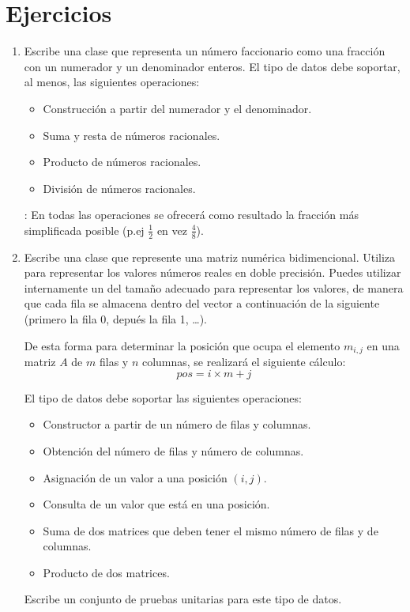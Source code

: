 \section{Ejercicios}

\begin{enumerate}

\item Escribe una clase  que representa un número faccionario como
      una fracción con un numerador y un denominador enteros. El tipo de datos
      debe soportar, al menos, las siguientes operaciones:

\begin{itemize}

  \item Construcción a partir del numerador y el denominador.
  \item Suma y resta de números racionales.
  \item Producto de números racionales.
  \item División de números racionales.

\end{itemize}

: En todas las operaciones se ofrecerá como resultado la fracción
                 más simplificada posible (p.ej $\frac{1}{2}$ en vez $\frac{4}{8}$).

\item Escribe una clase  que represente una matriz numérica bidimencional.
      Utiliza para representar los valores números reales en doble precisión.
      Puedes utilizar internamente un  del tamaño adecuado
      para representar los valores, de manera que cada fila se almacena dentro
      del vector a continuación de la siguiente (primero la fila 0, depués
      la fila 1, \ldots).

      De esta forma para determinar la posición que ocupa el elemento $m_{i,j}$
      en una matriz $A$ de $m$ filas y $n$ columnas, se realizará el siguiente
      cálculo:
\[
pos = i \times m + j
\]


      El tipo de datos debe soportar las siguientes operaciones:

\begin{itemize}
  \item Constructor a partir de un número de filas y columnas.
  \item Obtención del número de filas y número de columnas.
  \item Asignación de un valor a una posición $(i,j)$.
  \item Consulta de un valor que está en una posición.
  \item Suma de dos matrices que deben tener el mismo número de filas y de columnas.
  \item Producto de dos matrices.
\end{itemize}

      Escribe un conjunto de pruebas unitarias para este tipo de datos.

\end{enumerate}
